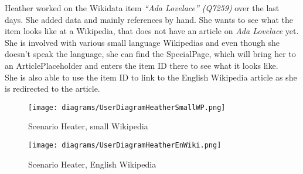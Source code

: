 Heather worked on the Wikidata item \textit{``Ada Lovelace'' (Q7259)} over the last days. She added data and mainly references by hand. She wants to see what the item looks like at a Wikipedia, that does not have an article on \textit{Ada Lovelace} yet. \\
She is involved with various small language Wikipedias and even though she doesn't speak the language, she can find the SpecialPage, which will bring her to an ArticlePlaceholder and enters the item ID there to see what it looks like. \\
She is also able to use the item ID to link to the English Wikipedia article as she is redirected to the article. 
\begin{figure}[H]
	\centering
	\texttt{[image: diagrams/UserDiagramHeatherSmallWP.png]}
	\caption{Scenario Heater, small Wikipedia}
	\label{fig:ScenarioHeatherSmall}
\end{figure}
\begin{figure}[H]
	\centering
	\texttt{[image: diagrams/UserDiagramHeatherEnWiki.png]}
	\caption{Scenario Heater, English Wikipedia}
	\label{fig:ScenarioHeatherEnWiki}
\end{figure}